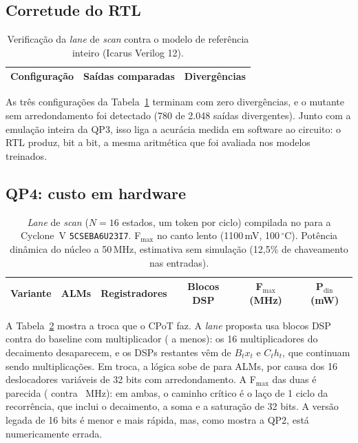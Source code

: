 \documentclass[12pt]{article}
\begin{document}
\subsection{Corretude do RTL}

\begin{table}[htb]
\centering
\caption{Verificação da \emph{lane} de \emph{scan} contra o modelo de referência inteiro (Icarus Verilog 12).}
\label{tab:verif}
\footnotesize
\begin{tabular}{lcc}
\toprule
\textbf{Configuração} & \textbf{Saídas comparadas} & \textbf{Divergências} \\
\midrule

\end{tabular}
\end{table}

As três configurações da Tabela~\ref{tab:verif} terminam com zero divergências, e o mutante sem arredondamento foi detectado (780 de 2.048 saídas divergentes). Junto com a emulação inteira da QP3, isso liga a acurácia medida em software ao circuito: o RTL produz, bit a bit, a mesma aritmética que foi avaliada nos modelos treinados.

\subsection{QP4: custo em hardware}

\begin{table}[htb]
\centering
\caption{\emph{Lane} de \emph{scan} ($N=16$ estados, um token por ciclo) compilada no \QuartusVersion{} para a Cyclone~V \texttt{5CSEBA6U23I7}. F$_{\max}$ no canto lento (1100\,mV, 100\,$^\circ$C). Potência dinâmica do núcleo a 50\,MHz, estimativa sem simulação (12,5\% de chaveamento nas entradas).}
\label{tab:quartus}
\footnotesize
\begin{tabular}{lccccc}
\toprule
\textbf{Variante} & \textbf{ALMs} & \textbf{Registradores} & \textbf{Blocos DSP} & \textbf{F$_{\max}$ (MHz)} & \textbf{P$_{\mathrm{din}}$ (mW)} \\
\midrule

\end{tabular}
\end{table}

A Tabela~\ref{tab:quartus} mostra a troca que o CPoT faz. A \emph{lane} proposta usa \DspCpot{} blocos DSP contra \DspMult{} do baseline com multiplicador (\DspSaving{} a menos): os 16 multiplicadores do decaimento desaparecem, e os DSPs restantes vêm de $B_t x_t$ e $C_t h_t$, que continuam sendo multiplicações. Em troca, a lógica sobe de \AlmMult{} para \AlmCpot{} ALMs, por causa dos 16 deslocadores variáveis de 32 bits com arredondamento. A F$_{\max}$ das duas é parecida (\FmaxCpot{} contra \FmaxMult{}~MHz): em ambas, o caminho crítico é o laço de 1 ciclo da recorrência, que inclui o decaimento, a soma e a saturação de 32 bits. A versão legada de 16 bits é menor e mais rápida, mas, como mostra a QP2, está numericamente errada.
\end{document}
